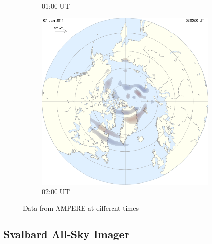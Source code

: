 \documentclass[10pt,a4paper]{article}
\begin{document}
\begin{figure}[h]
\begin{subfigure}{0.3\textwidth}
	\caption{ 01:00 UT \label{amp01}}
\end{subfigure}
\begin{subfigure}{0.3\textwidth}
\centering
	\includegraphics[width=\textwidth]{ampere8.png}
	\caption{ 02:00 UT \label{amp02}}
\end{subfigure}
\caption{Data from AMPERE at different times}
\end{figure}
\newpage
\subsection{Svalbard All-Sky Imager \label{0_CHAPTER_SVALBARDIM}}
\end{document}
